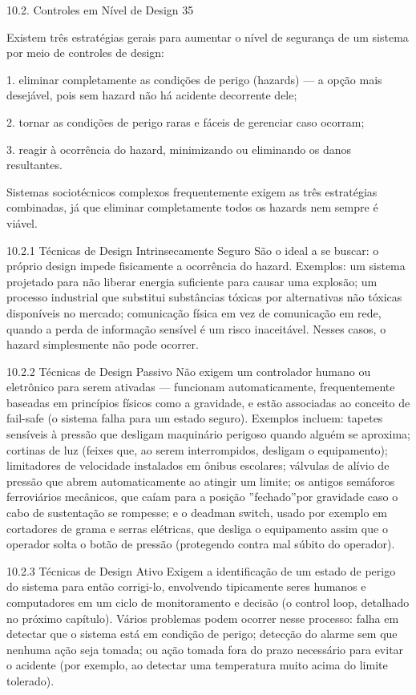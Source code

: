 10.2. Controles em Nível de Design 35

Existem três estratégias gerais para aumentar o nível de segurança de um sistema por meio de controles de design:

1. eliminar completamente as condições de perigo (hazards) — a opção mais desejável, pois sem hazard não há acidente decorrente dele;

2. tornar as condições de perigo raras e fáceis de gerenciar caso ocorram;

3. reagir à ocorrência do hazard, minimizando ou eliminando os danos resultantes.

Sistemas sociotécnicos complexos frequentemente exigem as três estratégias combinadas, já que eliminar completamente todos os hazards nem sempre é viável.

10.2.1 Técnicas de Design Intrinsecamente Seguro São o ideal a se buscar: o próprio design impede fisicamente a ocorrência do hazard. Exemplos: um sistema projetado para não liberar energia suficiente para causar uma explosão; um processo industrial que substitui substâncias tóxicas por alternativas não tóxicas disponíveis no mercado; comunicação física em vez de comunicação em rede, quando a perda de informação sensível é um risco inaceitável. Nesses casos, o hazard simplesmente não pode ocorrer.

10.2.2 Técnicas de Design Passivo Não exigem um controlador humano ou eletrônico para serem ativadas — funcionam automaticamente, frequentemente baseadas em princípios físicos como a gravidade, e estão associadas ao conceito de fail-safe (o sistema falha para um estado seguro). Exemplos incluem: tapetes sensíveis à pressão que desligam maquinário perigoso quando alguém se aproxima; cortinas de luz (feixes que, ao serem interrompidos, desligam o equipamento); limitadores de velocidade instalados em ônibus escolares; válvulas de alívio de pressão que abrem automaticamente ao atingir um limite; os antigos semáforos ferroviários mecânicos, que caíam para a posição ”fechado”por gravidade caso o cabo de sustentação se rompesse; e o deadman switch, usado por exemplo em cortadores de grama e serras elétricas, que desliga o equipamento assim que o operador solta o botão de pressão (protegendo contra mal súbito do operador).

10.2.3 Técnicas de Design Ativo Exigem a identificação de um estado de perigo do sistema para então corrigi-lo, envolvendo tipicamente seres humanos e computadores em um ciclo de monitoramento e decisão (o control loop, detalhado no próximo capítulo). Vários problemas podem ocorrer nesse processo: falha em detectar que o sistema está em condição de perigo; detecção do alarme sem que nenhuma ação seja tomada; ou ação tomada fora do prazo necessário para evitar o acidente (por exemplo, ao detectar uma temperatura muito acima do limite tolerado).

